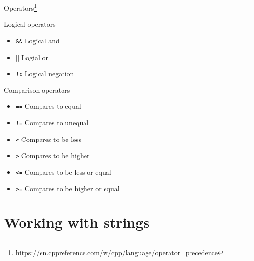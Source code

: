 \documentclass[\classoption]{beamer}
\begin{document}
\begin{frame}{Operators\footnote{\tiny\url{https://en.cppreference.com/w/cpp/language/operator_precedence}}}
\begin{block}{Logical operators}
\begin{itemize}
\item \lstinline|&&| Logical and
\item \lstinline|||| Logial or
\item \lstinline|!x| Logical negation 
\end{itemize}
\end{block}
\begin{block}{Comparison operators}
\begin{itemize}
\item \lstinline|==|  Compares to equal
\item \lstinline|!=| Compares to unequal
\item \lstinline|<| Compares to be less
\item \lstinline|>| Compares to be higher
\item \lstinline|<=| Compares to be less or equal
\item \lstinline|>=| Compares to be higher or equal
\end{itemize}
\end{block}
\end{frame}

\section{Working with strings}
\end{document}
